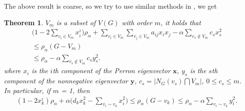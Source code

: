 \documentclass[amsthm]{elsart}
\newtheorem{theorem}{Theorem}[section]
\begin{document}
The above result is coarse, so we try to use similar methods in \cite{2012Bounds}, we get
\begin{theorem} \label{the:1}
$V_m$ is a subset of $V(G)$ with order $m$, it holds that
\begin{eqnarray} \label{equ:1}
\nonumber \big(1 - 2\sum \limits_{v_i \in V_m}^{} x_i^{_2} \big) \rho_\alpha
+ \sum \limits_{v_i \in V_m}^{} \sum \limits_{v_j \in V_m}^{} a_{ij}x_ix_j
- \alpha \sum \limits_{v_s \notin V_m}^{} c_s x_s^2
\\ \nonumber \leqslant \rho_\alpha(G - V_m) \qquad \;\,
\\  \leqslant  \rho_\alpha - \alpha \sum \limits_{v_s \notin V_m}^{} c_s y_s^2.
\end{eqnarray}
where $x_i$ is the $i$th component of the Perron eigenvector $\textbf{x}$, $y_s$ is the $s$th component of the nonnegative eigenvector $\textbf{y}$, $ c_s = |N_G(v_s) \bigcap V_m|$, $0\leqslant c_s \leqslant m$.
\\ In particular, if $m$ = 1, then
\begin{eqnarray} \label{equ:2}
(1 - 2x_k^{_2})\rho_\alpha
+ \alpha \big(d_k x_k^2 - \sum \limits_{v_i \sim v_k}^{} x_i^2 \big)
\leqslant \rho_\alpha(G - v_k)
\leqslant  \rho_\alpha - \alpha \sum \limits_{v_i \sim v_k}^{} y_i^2.
\end{eqnarray}
\end{theorem}
\end{document}
